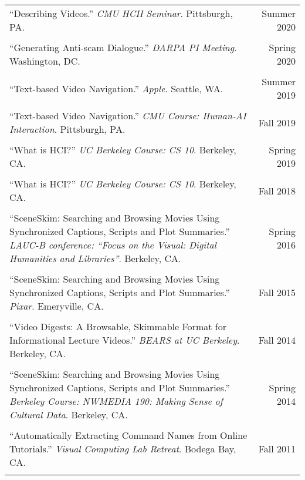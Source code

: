 \begin{longtable}{Xr}
	``Describing Videos.'' \textit{CMU HCII Seminar}. Pittsburgh, PA. & Summer 2020 \\
	\\

	``Generating Anti-scam Dialogue.'' \textit{DARPA PI Meeting}. Washington, DC. & Spring 2020 \\
	\\

	``Text-based Video Navigation.'' \textit{Apple}. Seattle, WA. & Summer 2019 \\
	\\

	``Text-based Video Navigation.'' \textit{CMU Course: Human-AI Interaction}. Pittsburgh, PA. & Fall 2019 \\
	\\

	``What is HCI?'' \textit{UC Berkeley Course: CS 10}. Berkeley, CA. & Spring 2019 \\
	\\

	``What is HCI?'' \textit{UC Berkeley Course: CS 10}. Berkeley, CA. & Fall 2018 \\
	\\

	``SceneSkim: Searching and Browsing Movies Using Synchronized Captions, Scripts and Plot Summaries.'' \textit{LAUC-B conference: ``Focus on the Visual: Digital Humanities and Libraries''}. Berkeley, CA. & Spring 2016 \\
	\\

	``SceneSkim: Searching and Browsing Movies Using Synchronized Captions, Scripts and Plot Summaries.'' \textit{Pixar}. Emeryville, CA. & Fall 2015 \\
	\\

	``Video Digests: A Browsable, Skimmable Format for Informational Lecture Videos.'' \textit{BEARS at UC Berkeley}. Berkeley, CA. & Fall 2014 \\
	\\

	``SceneSkim: Searching and Browsing Movies Using Synchronized Captions, Scripts and Plot Summaries.'' \textit{Berkeley Course: NWMEDIA 190: Making Sense of Cultural Data}. Berkeley, CA. & Spring 2014 \\
	\\

	``Automatically Extracting Command Names from Online Tutorials.'' \textit{Visual Computing Lab Retreat}. Bodega Bay, CA. & Fall 2011 \\
	\\

\end{longtable}